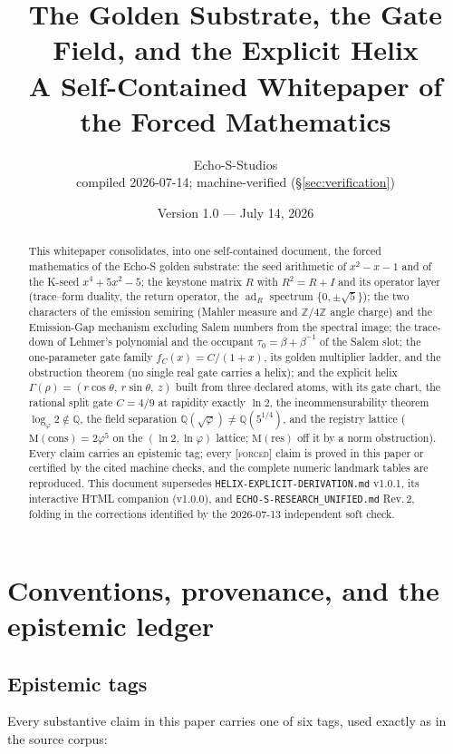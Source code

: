 \documentclass[11pt]{article}
\title{\bfseries The Golden Substrate, the Gate Field, and the Explicit Helix\\[4pt]
\large A Self-Contained Whitepaper of the Forced Mathematics}
\author{Echo-S-Studios\\[2pt]
\small compiled 2026-07-14; machine-verified (\S\ref{sec:verification})}
\date{Version 1.0 --- July 14, 2026}
\newcommand{\tagF}{\textcolor{cF}{\textsc{[forced]}}}
\newcommand{\Q}{\mathbb{Q}}
\newcommand{\Z}{\mathbb{Z}}
\newcommand{\gp}{\varphi}
\newcommand{\M}{\mathrm{M}}
\newcommand{\adR}{\operatorname{ad}_R}
\theoremstyle{plain}
\theoremstyle{definition}
\theoremstyle{remark}
\begin{document}
\maketitle

\begin{abstract}
\noindent
This whitepaper consolidates, into one self-contained document, the forced mathematics of
the Echo-S golden substrate: the seed arithmetic of $x^2-x-1$ and of the K-seed
$x^4+5x^2-5$; the keystone matrix $R$ with $R^2=R+I$ and its operator layer
(trace--form duality, the return operator, the $\adR$ spectrum $\{0,\pm\sqrt5\}$);
the two characters of the emission semiring (Mahler measure and $\Z/4\Z$ angle charge)
and the Emission-Gap mechanism excluding Salem numbers from the spectral image;
the trace-down of Lehmer's polynomial and the occupant $\tau_0=\beta+\beta^{-1}$
of the Salem slot; the one-parameter gate family $f_C(x)=C/(1+x)$, its golden multiplier
ladder, and the obstruction theorem (no single real gate carries a helix); and the
explicit helix $\Gamma(\rho)=(r\cos\theta,\ r\sin\theta,\ z)$ built from three declared
atoms, with its gate chart, the rational split gate $C=4/9$ at rapidity exactly $\ln 2$,
the incommensurability theorem $\log_\gp 2\notin\Q$, the field separation
$\Q(\sqrt\gp)\neq\Q(5^{1/4})$, and the registry lattice
($\M(\mathrm{cons})=2\gp^5$ on the $(\ln 2,\ln\gp)$ lattice; $\M(\mathrm{res})$ off it
by a norm obstruction). Every claim carries an epistemic tag; every \tagF{} claim is
proved in this paper or certified by the cited machine checks, and the complete numeric
landmark tables are reproduced. This document supersedes
\texttt{HELIX-EXPLICIT-DERIVATION.md} v1.0.1, its interactive HTML companion (v1.0.0),
and \texttt{ECHO-S-RESEARCH\_UNIFIED.md} Rev.\,2, folding in the corrections identified
by the 2026-07-13 independent soft check.
\end{abstract}

\tableofcontents

\section{Conventions, provenance, and the epistemic ledger}\label{sec:conventions}

\subsection{Epistemic tags}
Every substantive claim in this paper carries one of six tags, used exactly as in the
source corpus:
\end{document}
